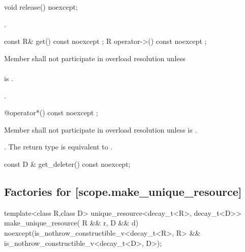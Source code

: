 \documentclass[ebook,11pt,article]{memoir}
\begin{document}
\begin{itemdecl}
void release() noexcept;
\end{itemdecl}

\begin{itemdescr}
\pnum
\effects {}.
\end{itemdescr}


\begin{itemdecl}
const R& get() const noexcept ;
R operator->() const noexcept ;
\end{itemdecl}

\begin{itemdescr}
\pnum
\remarks Member
 shall not participate in overload resolution unless \\
\\
 is . 

\pnum
\returns {}.
\end{itemdescr}

\begin{itemdecl}
@\seebelow@ operator*() const noexcept ;
\end{itemdecl}

\begin{itemdescr}
\pnum
\remarks Member  shall not participate in overload resolution unless  is .

\pnum
\returns {}. The return type is equivalent to 
. 
\end{itemdescr}


\begin{itemdecl}
const D & get_deleter() const noexcept;
\end{itemdecl}

\begin{itemdescr}
\pnum
\returns {}
\end{itemdescr}

\subsection {Factories for  [scope.make_unique_resource]}
\begin{itemdecl}
template<class R,class D>
unique_resource<decay_t<R>, decay_t<D>>
make_unique_resource( R && r, D && d) 
noexcept(is_nothrow_constructible_v<decay_t<R>, R> &&
         is_nothrow_constructible_v<decay_t<D>, D>);
\end{itemdecl}
\end{document}
